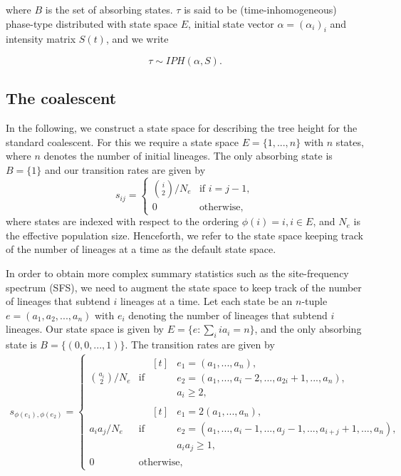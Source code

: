 \documentclass[hidelinks,11pt]{article}
\begin{document}
where $B$ is the set of absorbing states. $\tau$ is said to be (time-inhomogeneous) phase-type distributed with state space $E$, initial state vector $\alpha=(\alpha_i)_i$ and intensity matrix $S(t)$, and we write

\begin{equation*}
\tau \sim IPH(\alpha,S).
\end{equation*}

\subsection{The coalescent}
In the following, we construct a state space for describing the tree height for the standard coalescent. For this we require a state space $E=\{1, ..., n\}$ with $n$ states, where $n$ denotes the number of initial lineages. The only absorbing state is $B=\{1\}$ and our transition rates are given by
\begin{equation*}
s_{ij} = \begin{cases} \binom{i}{2} / N_e & \text{if } i = j - 1, \\ 0 & \text{otherwise,} \end{cases}
\end{equation*}
where states are indexed with respect to the ordering $\phi(i) = i, i \in E$, and $N_e$ is the effective population size. Henceforth, we refer to the state space keeping track of the number of lineages at a time as the default state space.

In order to obtain more complex summary statistics such as the site-frequency spectrum (SFS), we need to augment the state space to keep track of the number of lineages that subtend $i$ lineages at a time. Let each state be an $n$-tuple $e=(a_1, a_2, ..., a_n)$ with $e_i$ denoting the number of lineages that subtend $i$ lineages. Our state space is given by $E=\{e: \sum_i ia_i = n\}$, and the only absorbing state is $B=\{(0, 0, ..., 1)\}$. The transition rates are given by \citep{phasetype_popgen}
\begin{align*}
s_{\phi(e_1),\phi(e_2)} = 
\begin{cases} 
\binom{a_i}{2} / N_e & \text{if } 
\begin{aligned}[t]
& e_1=(a_1,...,a_n), \\
& e_2=(a_1,...,a_i-2,...,a_{2i}+1,...,a_{n}), \\
& a_i \geq 2, 
\end{aligned} \\
a_i a_j / N_e & \text{if } 
\begin{aligned}[t]
& e_1=2(a_1,...,a_n), \\
& e_2=(a_1,...,a_i-1,...,a_j-1,...,a_{i+j}+1,...,a_{n}), \\
& a_i a_j \geq 1, 
\end{aligned} \\
0 & \text{otherwise,}
\end{cases}
\end{align*}
\end{document}

